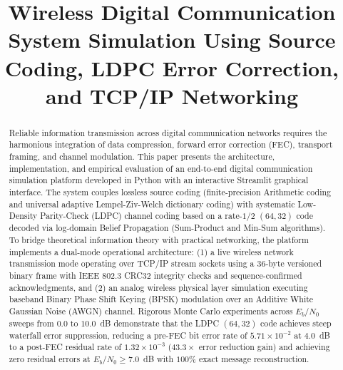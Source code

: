\documentclass[conference]{IEEEtran}
\begin{document}
\title{Wireless Digital Communication System Simulation Using Source Coding, LDPC Error Correction, and TCP/IP Networking}

\author{
  \and
  \and
}

\maketitle

\begin{abstract}
Reliable information transmission across digital communication networks requires the harmonious integration of data compression, forward error correction (FEC), transport framing, and channel modulation. This paper presents the architecture, implementation, and empirical evaluation of an end-to-end digital communication simulation platform developed in Python with an interactive Streamlit graphical interface. The system couples lossless source coding (finite-precision Arithmetic coding and universal adaptive Lempel-Ziv-Welch dictionary coding) with systematic Low-Density Parity-Check (LDPC) channel coding based on a rate-$1/2$ $(64, 32)$ code decoded via log-domain Belief Propagation (Sum-Product and Min-Sum algorithms). To bridge theoretical information theory with practical networking, the platform implements a dual-mode operational architecture: (1) a live wireless network transmission mode operating over TCP/IP stream sockets using a 36-byte versioned binary frame with IEEE 802.3 CRC32 integrity checks and sequence-confirmed acknowledgments, and (2) an analog wireless physical layer simulation executing baseband Binary Phase Shift Keying (BPSK) modulation over an Additive White Gaussian Noise (AWGN) channel. Rigorous Monte Carlo experiments across $E_b/N_0$ sweeps from $0.0$ to $10.0$~dB demonstrate that the LDPC $(64, 32)$ code achieves steep waterfall error suppression, reducing a pre-FEC bit error rate of $5.71 \times 10^{-2}$ at $4.0$~dB to a post-FEC residual rate of $1.32 \times 10^{-3}$ ($43.3\times$ error reduction gain) and achieving zero residual errors at $E_b/N_0 \ge 7.0$~dB with $100\%$ exact message reconstruction.
\end{abstract}
\end{document}
